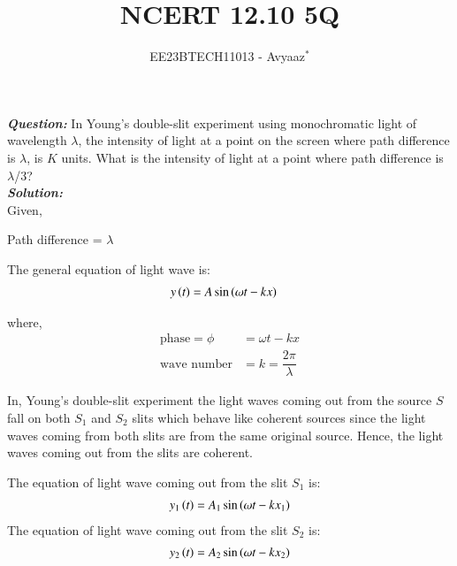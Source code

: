 \documentclass[journal,12pt,twocolumn]{IEEEtran}
\theoremstyle{remark}
\begin{document}

\vspace{3cm}

\title{NCERT 12.10 5Q}
\author{EE23BTECH11013 - Avyaaz$^{*}$%
}
\maketitle
\newpage
\bigskip

\renewcommand{\thefigure}{\theenumi}
\renewcommand{\thetable}{\arabic{table}}

\large\textbf{\textsl{Question:}}
In Young’s double-slit experiment using monochromatic light of wavelength $\lambda$, the intensity of light at a point on the screen where path difference is $\lambda$, is $K$ units. What is the intensity of light at a
point where path difference is $\lambda$/3?\\
\large\textbf{\textsl{Solution:}}\\
Given,\\
\begin{table}[htbp]
\centering

\vspace{0.2cm}
\caption{\normalsize $Parameters$}
\label{tab:parameters}
\end{table}

\hspace*{1cm}Path difference = $\lambda$

The general equation of light wave is:
\begin{align}
       y\left(t\right) &= A\sin{(\omega t - kx)} \label{eq:lightwave}
\end{align}

 where,
 \begin{align}
 \text{phase} = \phi &= \omega t - kx \nonumber \\
 \text{wave number} &= k = \dfrac{2\pi}{\lambda} \nonumber 
 \end{align}

In, Young's double-slit experiment the light waves coming out from the source $S$ fall on both $S_1$ and $S_2$ slits which behave like coherent sources since the light waves coming from both slits are from the same original source. Hence, the light waves coming out from the slits are coherent.

\vspace{0.3cm}

The equation of light wave coming out from the slit $S_1$ is:
\begin{align}
    y_1\left(t\right) = A_1\sin{(\omega t - kx_1)} \label{phase_1}
\end{align}
The equation of light wave coming out from the slit $S_2$ is:
\begin{align}
     y_2\left(t\right) = A_2\sin{(\omega t - kx_2)} \label{phase_2}
\end{align}
\end{document}
